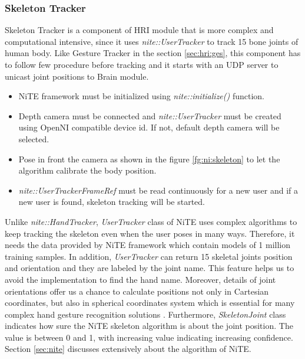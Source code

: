\subsubsection{Skeleton Tracker} Skeleton Tracker is a component of HRI module that is more complex and computational intensive, since it uses \textit{nite::UserTracker} to track 15 bone joints of human body. Like Gesture Tracker in the section \ref{sec:hri:ges}, this component has to follow few procedure before tracking and it starts with an UDP server to unicast joint positions to Brain module.
\begin{itemize}
	\item NiTE framework must be initialized using \textit{nite::initialize()} function. 
	\item Depth camera must be connected and \textit{nite::UserTracker} must be created using OpenNI compatible device id. If not, default depth camera will be selected. 
	\item Pose in front the camera as shown in the figure \ref{fg:ni:skeleton} to let the algorithm calibrate the body position. 
	\item \textit{nite::UserTrackerFrameRef }must be read continuously for a new user and if a new user is found, skeleton tracking will be started. 
\end{itemize}



Unlike \textit{nite::HandTracker}, \textit{UserTracker} class of NiTE uses complex algorithms to keep tracking the skeleton even when the user poses in many ways. Therefore, it needs the data provided by NiTE framework which contain models of 1 million training samples. In addition, \textit{UserTracker} can return 15 skeletal joints position and orientation and they are labeled by the joint name. This feature helps us to avoid the implementation to find the hand name. Moreover, details of joint orientations offer us a chance to calculate positions not only in Cartesian coordinates, but also in spherical coordinates system which is essential for many complex hand gesture recognition solutions \cite{21}. Furthermore, \textit{SkeletonJoint} class indicates how sure the NiTE skeleton algorithm is about the joint position. The value is between 0 and 1, with increasing value indicating increasing confidence. Section \ref{sec:nite} discusses extensively about the algorithm of NiTE.

